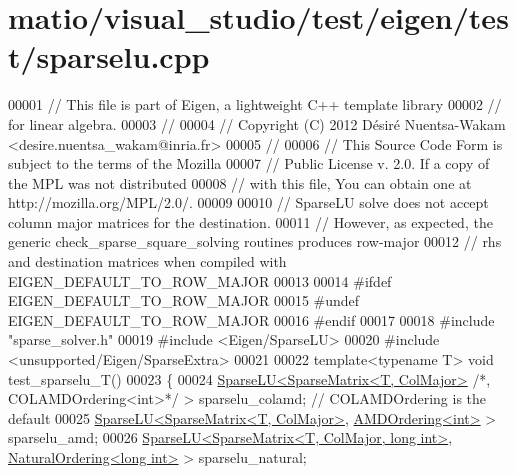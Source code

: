 \hypertarget{matio_2visual__studio_2test_2eigen_2test_2sparselu_8cpp_source}{}\section{matio/visual\+\_\+studio/test/eigen/test/sparselu.cpp}
\label{matio_2visual__studio_2test_2eigen_2test_2sparselu_8cpp_source}

\begin{DoxyCode}
00001 \textcolor{comment}{// This file is part of Eigen, a lightweight C++ template library}
00002 \textcolor{comment}{// for linear algebra.}
00003 \textcolor{comment}{//}
00004 \textcolor{comment}{// Copyright (C) 2012 Désiré Nuentsa-Wakam <desire.nuentsa\_wakam@inria.fr>}
00005 \textcolor{comment}{//}
00006 \textcolor{comment}{// This Source Code Form is subject to the terms of the Mozilla}
00007 \textcolor{comment}{// Public License v. 2.0. If a copy of the MPL was not distributed}
00008 \textcolor{comment}{// with this file, You can obtain one at http://mozilla.org/MPL/2.0/.}
00009 
00010 \textcolor{comment}{// SparseLU solve does not accept column major matrices for the destination.}
00011 \textcolor{comment}{// However, as expected, the generic check\_sparse\_square\_solving routines produces row-major}
00012 \textcolor{comment}{// rhs and destination matrices when compiled with EIGEN\_DEFAULT\_TO\_ROW\_MAJOR}
00013 
00014 \textcolor{preprocessor}{#ifdef EIGEN\_DEFAULT\_TO\_ROW\_MAJOR}
00015 \textcolor{preprocessor}{#undef EIGEN\_DEFAULT\_TO\_ROW\_MAJOR}
00016 \textcolor{preprocessor}{#endif}
00017 
00018 \textcolor{preprocessor}{#include "sparse\_solver.h"}
00019 \textcolor{preprocessor}{#include <Eigen/SparseLU>}
00020 \textcolor{preprocessor}{#include <unsupported/Eigen/SparseExtra>}
00021 
00022 \textcolor{keyword}{template}<\textcolor{keyword}{typename} T> \textcolor{keywordtype}{void} test\_sparselu\_T()
00023 \{
00024   \hyperlink{group___sparse_l_u___module_class_eigen_1_1_sparse_l_u}{SparseLU<SparseMatrix<T, ColMajor>} \textcolor{comment}{/*, COLAMDOrdering<int>*/} > 
      sparselu\_colamd; \textcolor{comment}{// COLAMDOrdering is the default}
00025   \hyperlink{group___sparse_l_u___module_class_eigen_1_1_sparse_l_u}{SparseLU<SparseMatrix<T, ColMajor>}, 
      \hyperlink{group___ordering_methods___module_class_eigen_1_1_a_m_d_ordering}{AMDOrdering<int>} > sparselu\_amd; 
00026   \hyperlink{group___sparse_l_u___module_class_eigen_1_1_sparse_l_u}{SparseLU<SparseMatrix<T, ColMajor, long int>}, 
      \hyperlink{group___ordering_methods___module_class_eigen_1_1_natural_ordering}{NaturalOrdering<long int>} > sparselu\_natural;

\end{DoxyCode}
